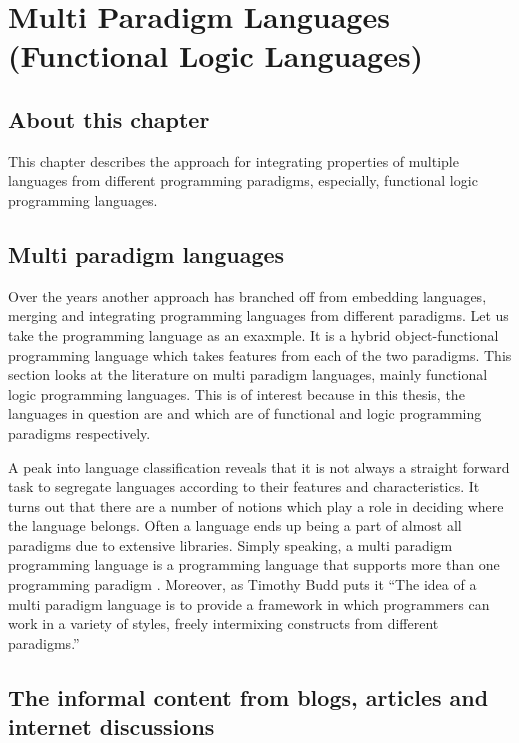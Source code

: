 \documentclass[thesis-solanki.tex]{subfiles}
\begin{document}
\chapter{Multi Paradigm Languages (Functional Logic Languages)}\label{chap:multiparadigm}


\section{About this chapter}

This chapter describes the approach for integrating properties of multiple languages from different programming
paradigms, especially, functional logic programming languages.

\section{Multi paradigm languages}
Over the years another approach has branched off from embedding languages, merging and integrating programming
languages from different paradigms.
Let us take the  programming language \cite{website:scala} as an exaxmple. It is a hybrid
object-functional programming language which takes features from each of the two paradigms.
This section looks at the literature on multi paradigm languages, mainly functional logic programming
languages. This is of interest because in this thesis, the languages in question are  
and  which are of functional and logic programming paradigms respectively.

A peak into language classification reveals that it is not always a straight forward task to segregate languages
according to their features and characteristics.
It turns out that there are a number of notions which play a role in deciding where the language belongs.
Often a language ends up being a part of almost all paradigms due to extensive libraries.
Simply speaking, a multi paradigm programming language is a programming language that supports more than one
programming paradigm \cite{Krishnamurthi:2008:TPL:1480828.1480846}. Moreover, as Timothy Budd puts it
\cite{website:wikimultiparadigm} ``The idea of a multi paradigm language is to provide a framework in which
programmers can work in a variety of styles, freely intermixing constructs from different paradigms.''


\section{The informal content from blogs, articles and internet discussions}
  
\end{document}
